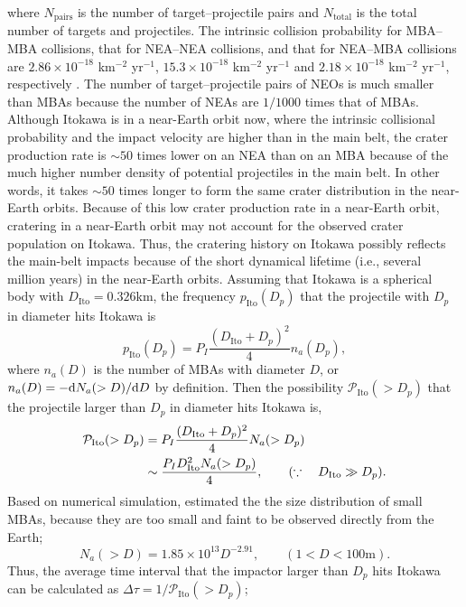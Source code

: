 \documentclass[3p,authoryear]{elsarticle}
\begin{document}
where $N_\text{pairs}$ is the number of target--projectile pairs and $N_\text{total}$ is the total number of targets and projectiles.
The intrinsic collision probability for MBA--MBA collisions, that for NEA--NEA collisions, and that for NEA--MBA collisions are $2.86\times 10^{-18}$ km$^{-2}$ yr$^{-1}$, $15.3\times 10^{-18}$ km$^{-2}$ yr$^{-1}$ and $2.18\times 10^{-18}$ km$^{-2}$ yr$^{-1}$, respectively \citep{bottke1994}.
The number of target--projectile pairs of NEOs is much smaller than MBAs because the number of NEAs are $1/1000$ times that of MBAs.
Although Itokawa is in a near-Earth orbit now, where the intrinsic collisional probability and the impact velocity are higher than in the main belt,
the crater production rate is $\sim 50$ times lower on an NEA than on an MBA because of the much higher number density of potential projectiles in the main belt.
In other words, it takes $\sim 50$ times longer to form the same crater distribution in the near-Earth orbits.
Because of this low crater production rate in a near-Earth orbit, cratering in a near-Earth orbit may not account for the observed crater population on Itokawa.
Thus, the cratering history on Itokawa possibly reflects the main-belt impacts because of the short dynamical lifetime (i.e., several million years) in the near-Earth orbits.
Assuming that Itokawa is a spherical body with $D_\text{Ito}=0.326$km, the frequency $p_\text{Ito}(D_p)$ that the projectile with $D_p$ in diameter hits Itokawa is
\begin{equation}
	p_\text{Ito}(D_p) = P_I\frac{(D_\text{Ito}+D_p)^2}{4}n_a(D_p),
\end{equation}
where $n_a(D)$ is the number of MBAs with diameter $D$, or $n_a(D)=-{\rm d} N_a(>D)/{\rm d} D$ by definition.
Then the possibility $\mathcal{P}_\text{Ito}(>D_p)$ that the projectile larger than $D_p$ in diameter hits Itokawa is,
\begin{align}
	\mathcal{P}_\text{Ito}(>D_p) &= P_I\frac{(D_\text{Ito}+D_p)^2}{4}N_a(>D_p) \notag\\
	&\sim \frac{P_I D_\text{Ito}^2N_a(>D_p)}{4},\qquad (\because\quad D_\text{Ito} \gg D_p).
\end{align}
Based on numerical simulation, \citet{obrien2005} estimated the the size distribution of small MBAs, because they are too small and faint to be observed directly from the Earth;
\begin{equation}
	N_a(>D)=1.85\times 10^{13}D^{-2.91},\qquad (1<D<100\text{m}).
\end{equation}
Thus, the average time interval that the impactor larger than $D_p$ hits Itokawa can be calculated as $\Delta \tau =1/\mathcal{P}_\text{Ito}(>D_p)$;
\end{document}
